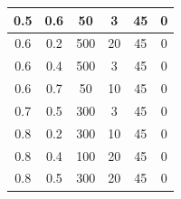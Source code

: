 \begin{center}
\begin{longtable}[c]{|c|c|c|c|c|c|}
        0.5 &  0.6 &   50 &    3 &    45 &     0 \\ \hline
        0.6 &  0.2 &  500 &   20 &    45 &     0 \\ \hline
        0.6 &  0.4 &  500 &    3 &    45 &     0 \\ \hline
        0.6 &  0.7 &   50 &   10 &    45 &     0 \\ \hline
        0.7 &  0.5 &  300 &    3 &    45 &     0 \\ \hline 
        0.8 &  0.2 &  300 &   10 &    45 &     0 \\ \hline
        0.8 &  0.4 &  100 &   20 &    45 &     0 \\ \hline
        0.8 &  0.5 &  300 &   20 &    45 &     0 \\ \hline
\end{longtable}
\end{center}


